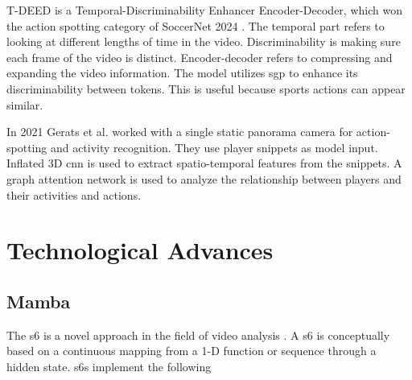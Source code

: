 T-DEED \cite{xarles_t-deed_2024} is a Temporal-Discriminability Enhancer Encoder-Decoder, which won the action spotting category of SoccerNet 2024 \cite{cioppa_soccernet_2024}. The temporal part refers to looking at different lengths of time in the video. Discriminability is making sure each frame of the video is distinct. Encoder-decoder refers to compressing and expanding the video information. The model utilizes \acrfull{sgp} to enhance its discriminability between tokens. This is useful because sports actions can appear similar. 

In 2021 Gerats et al. \cite{gerats_individual_same_task_2021} worked with a single static panorama camera for action-spotting and activity recognition. They use player snippets as model input. Inflated 3D \acrshort{cnn} is used to extract spatio-temporal features from the snippets. A graph attention network is used to analyze the relationship between players and their activities and actions. 





\section{Technological Advances}
\label{sec:technological_advances}

\subsection{Mamba}
The \acrfull{s6} \cite{gu_mamba_2024} is a novel approach in the field of video analysis \cite{li_videomamba_2024}. A \acrlong{s6} is conceptually based on a continuous mapping from a 1-D function or sequence through a hidden state. \acrlong{s6}s implement the following

